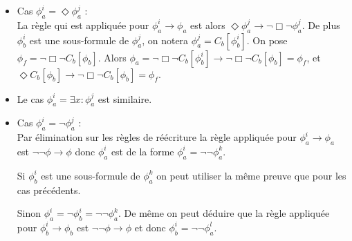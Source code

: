 \documentclass[12pt]{article}
\newcommand{\lra}{\ensuremath{\longrightarrow}}
\begin{document}
\begin{itemize}
\item Cas \(\phi_a^i = \Diamond \phi_a^j\) : \\
  La règle qui est appliquée pour \(\phi_a^i \lra \phi_a\) est alors \(\Diamond \phi_a^j \lra \neg \Box \neg \phi_a^j\).
  De plus \(\phi_b^i\) est une sous-formule de \(\phi_a^j\), on notera \(\phi_a^j = C_b[\phi_b^i]\).
  On pose \(\phi_f = \neg \Box \neg C_b[\phi_b]\).
  Alors \(\phi_a = \neg \Box \neg C_b[\phi_b^i] \lra \neg \Box \neg C_b[\phi_b] = \phi_f\), et \(\Diamond C_b[\phi_b] \lra \neg \Box \neg C_b[\phi_b] = \phi_f\).

\item Le {cas \(\phi_a^i = \exists x : \phi_a^j\)} est similaire.
\item Cas \(\phi_a^i = \neg \phi_a^j\) : \\
  Par élimination sur les règles de réécriture la règle appliquée pour \(\phi_a^i \lra \phi_a\) est \(\neg \neg \phi \lra \phi\) donc \(\phi_a^i\) est de la forme \(\phi_a^i = \neg \neg \phi_a^k\).

  Si \(\phi_b^i\) est une sous-formule de \(\phi_a^k\) on peut utiliser la même preuve que pour les cas précédents.
  
  Sinon \(\phi_a^i = \neg \phi_b^i = \neg \neg \phi_a^k\).
  De même on peut déduire que la règle appliquée pour \(\phi_b^i \lra \phi_b\) est \(\neg \neg \phi \lra \phi\) et donc \(\phi_b^i = \neg \neg \phi_a^l\).


\end{itemize}
\end{document}
